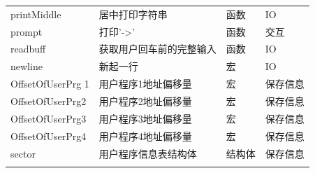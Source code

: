\documentclass[a4paper, 11pt]{article} %
\begin{document}
\begin{table}[]
\begin{tabular}{llll}
  {\color[HTML]{000000} printMiddle}                           & {\color[HTML]{000000} 居中打印字符串}                                     & {\color[HTML]{000000} 函数}                                  & {\color[HTML]{000000} IO}    \\
  {\color[HTML]{000000} prompt}                                & {\color[HTML]{000000} 打印'-\textgreater{}'}                         & {\color[HTML]{000000} 函数}                                  & {\color[HTML]{000000} 交互}    \\
  {\color[HTML]{000000} readbuff}                              & {\color[HTML]{000000} 获取用户回车前的完整输入}                                & {\color[HTML]{000000} 函数}                                  & {\color[HTML]{000000} IO}    \\
  {\color[HTML]{000000} newline}                               & {\color[HTML]{000000} 新起一行}                                        & {\color[HTML]{000000} 宏}                                   & {\color[HTML]{000000} IO}    \\
  {\color[HTML]{000000} OffsetOfUserPrg 1}                     & {\color[HTML]{000000} 用户程序1地址偏移量}                                  & {\color[HTML]{000000} 宏}                                   & {\color[HTML]{000000} 保存信息}  \\
  {\color[HTML]{000000} OffsetOfUserPrg2}                      & {\color[HTML]{000000} 用户程序2地址偏移量}                                  & {\color[HTML]{000000} 宏}                                   & {\color[HTML]{000000} 保存信息}  \\
  {\color[HTML]{000000} OffsetOfUserPrg3}                      & {\color[HTML]{000000} 用户程序3地址偏移量}                                  & {\color[HTML]{000000} 宏}                                   & {\color[HTML]{000000} 保存信息}  \\
  {\color[HTML]{000000} OffsetOfUserPrg4}                      & {\color[HTML]{000000} 用户程序4地址偏移量}                                  & {\color[HTML]{000000} 宏}                                   & {\color[HTML]{000000} 保存信息}  \\
  {\color[HTML]{000000} sector}                                & {\color[HTML]{000000} 用户程序信息表结构体}                                  & {\color[HTML]{000000} 结构体}                                 & {\color[HTML]{000000} 保存信息}  \\
  {\color[HTML]{000000} }                                      & {\color[HTML]{000000} }                                            & {\color[HTML]{000000} }                                    &                             
  \end{tabular}
  \end{table}
\end{document}
